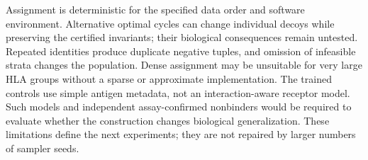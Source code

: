 \documentclass[11pt,a4paper]{article}
\begin{document}
Assignment is deterministic for the specified data order and software environment. Alternative optimal cycles can change individual decoys while preserving the certified invariants; their biological consequences remain untested. Repeated identities produce duplicate negative tuples, and omission of infeasible strata changes the population. Dense assignment may be unsuitable for very large HLA groups without a sparse or approximate implementation. The trained controls use simple antigen metadata, not an interaction-aware receptor model. Such models and independent assay-confirmed nonbinders would be required to evaluate whether the construction changes biological generalization. These limitations define the next experiments; they are not repaired by larger numbers of sampler seeds.
\end{document}

